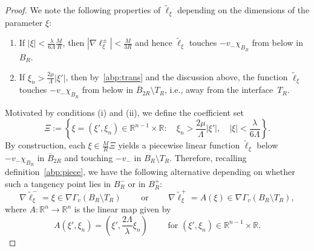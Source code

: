 \documentclass[10pt,a4paper]{amsart}
\newcommand{\R}{\mathbb{R}}
\newcommand{\chara}[1]{\chi_{#1}}
\begin{document}
\begin{proof}
\medskip

We note the following properties of $\widetilde{\ell}_{\xi}$ depending on the dimensions of the parameter $\xi$:
\begin{enumerate}[label=(\roman*)]
\item If $|\xi| < \frac{\lambda}{6 \Lambda} \frac{M}{R}$, then $|\nabla \ell_{\xi}^{\pm}| < \frac{M}{3R}$ and hence $\widetilde{\ell}_{\xi}$ touches $-v_{-} \chara{B_R}$ from below in $B_R$.
\item If $\xi_n > \frac{2 \mu}{\Lambda} |\xi'|$, then by~\eqref{abp:trans} and the discussion above, the function $\widetilde{\ell}_{\xi}$ touches $-v_{-}\chara{B_R}$ from below in $\overline{B}_{2R} \setminus T_R$, i.e., away from the interface~$T_R$.
\end{enumerate}
Motivated by conditions (i) and (ii), we define the coefficient set 
\[
\Xi := \left\{\xi = (\xi', \xi_n) \in \R^{n-1}\times \R \colon \quad  \xi_n > \frac{2\mu}{\Lambda} |\xi'|, \quad |\xi| < \frac{\lambda}{6 \Lambda}\right\}.
\]
By construction, each $\xi \in \frac{M}{R}\Xi$ yields a piecewise linear function $\widetilde{\ell}_{\xi}$ below $- v_{-} \chara{B_R}$ in $\overline{B}_{2R}$ and touching $-v_{-}$ in $B_R\setminus T_R$.
Therefore, recalling definition~\eqref{abp:piece}, we have the following alternative depending on whether such a tangency point lies in $B_R^{-}$ or in $B_R^{+}$:
\[
\nabla \widetilde{\ell}^{-}_{\xi} = \xi 
\in \nabla \Gamma_{v}(B_R \setminus T_R)
\qquad \text{ or } \qquad 
\nabla \widetilde{\ell}^{+}_{\xi} = A (\xi) \in \nabla \Gamma_{v}(B_R \setminus T_R),
\]
where $A \colon \R^{n} \to \R^{n}$ is the linear map given by
\[
A(\xi', \xi_n) = (\xi', \textstyle\frac{2\Lambda}{\lambda} \xi_n) \qquad \text{ for } (\xi', \xi_n) \in \R^{n-1} \times \R.
\]

\medskip


\end{proof}
\end{document}
